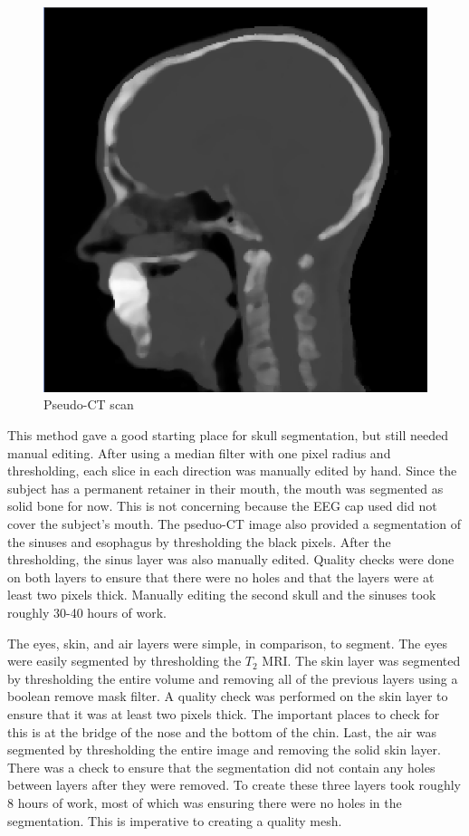 \begin{figure}[H]
\begin{center}
\includegraphics[width=.75\textwidth]{Figures/pseudo_CT}
\caption{Pseudo-CT scan}
\label{fig:ct}
\end{center}
\end{figure}

This method gave a good starting place for skull segmentation, but still needed manual editing. After using a median filter with one pixel radius and thresholding, each slice in each direction was manually edited by hand. Since the subject has a permanent retainer in their mouth, the mouth was segmented as solid bone for now. This is not concerning because the EEG cap used did not cover the subject's mouth. The pseduo-CT image also provided a segmentation of the sinuses and esophagus by thresholding the black pixels. After the thresholding, the sinus layer was also manually edited. Quality checks were done on both layers to ensure that there were no holes and that the layers were at least two pixels thick. Manually editing the second skull and the sinuses took roughly 30-40 hours of work. 

The eyes, skin, and air layers were simple, in comparison, to segment. The eyes were easily segmented by thresholding the $T_2$ MRI. The skin layer was segmented by thresholding the entire volume and removing all of the previous layers using a boolean remove mask filter. A quality check was performed on the skin layer to ensure that it was at least two pixels thick. The important places to check for this is at the bridge of the nose and the bottom of the chin. Last, the air was segmented by thresholding the entire image and removing the solid skin layer. There was a check to ensure that the segmentation did not contain any holes between layers after they were removed. To create these three layers took roughly 8 hours of work, most of which was ensuring there were no holes in the segmentation. This is imperative to creating a quality mesh.

